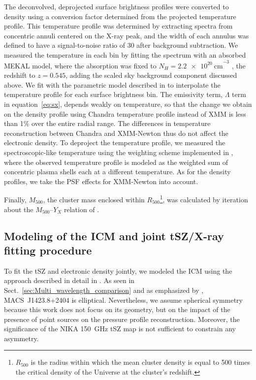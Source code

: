 \documentclass[traditabstract]{aa}
\begin{document}
The deconvolved, deprojected surface brightness profiles were converted to density using a conversion factor determined from the projected temperature profile. This temperature profile was determined by extracting spectra from concentric annuli centered on the X-ray peak, and the width of each annulus was defined to have a signal-to-noise ratio of $30$ after background subtraction. We measured the temperature in each bin by fitting the spectrum with an absorbed {\sc MEKAL} model, where the absorption was fixed to $N_{H}=\SI{2.2e20}{\centi\meter}^{-3}$ \citep{kalberla2005}, the redshift to $z=0.545$, adding the scaled sky background component discussed above.  We fit with the parametric model described in \cite{vikhlinin2006} to interpolate the temperature profile for each
surface brightness bin. The emissivity term, $\Lambda$ term in equation~\ref{eq:sx}, depends weakly on temperature, so that the change we obtain on the density profile using Chandra temperature profile instead of XMM is less than 1\% over the entire radial range. The differences in temperature reconstruction between Chandra and XMM-Newton \citep[e.g.,][]{sch15} thus do not affect the electronic density. To deproject the temperature profile, we measured the spectroscopic-like temperature \citep{mazzotta2004} using the weighting scheme implemented in \cite{vikh_multit}, where the observed temperature profile is modeled as the weighted sum of concentric plasma shells each at a different temperature. As for the density profiles, we take  the PSF effects for XMM-Newton into account. 

Finally, $M_{500}$, the cluster mass enclosed within $R_{500}$\footnote{$R_{500}$ is the radius within which the mean cluster density is equal to 500 times the critical density of the Universe at the cluster's redshift.}, was calculated by iteration about the $M_{500}$--$Y_X$ relation of \cite{arnaud2010}.

\subsection{Modeling of the ICM and joint tSZ/X-ray fitting procedure}\label{sec:modeling}
To fit the tSZ and electronic density jointly, we modeled the ICM using the approach described in detail in \cite{adam2014}. As seen in Sect.~\ref{sec:Multi_wavelength_comparison} and as emphasized by \cite{morandi2010}, \mbox{MACS~J1423.8+2404} is elliptical. Nevertheless, we assume spherical symmetry because this work does not focus on its geometry, but on the impact of the presence of point sources on the pressure profile reconstruction. Moreover, the significance of the NIKA 150~GHz tSZ map is not sufficient to constrain any asymmetry. 
\end{document}
